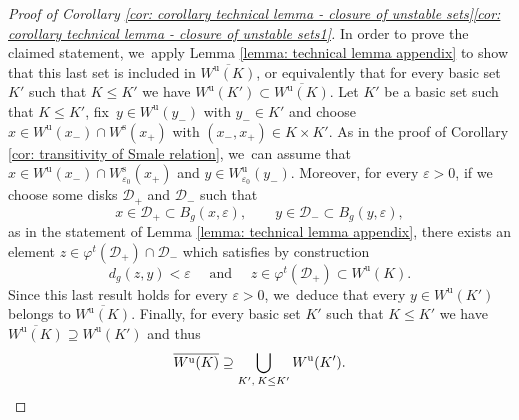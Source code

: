 \documentclass[11pt]{article}
\newcommand{\rs}{\mathrm{s}}
\newcommand{\ru}{\mathrm{u}}
\theoremstyle{definition}
\theoremstyle{plain}
\newcommand{\D}{\mathcal{D}}
\begin{document}
\begin{appendix}
\begin{proof}[Proof of Corollary \ref{cor: corollary technical lemma - closure of unstable sets}\eqref{cor: corollary technical lemma - closure of unstable sets1}]
In order to prove the claimed statement, we~apply Lemma \ref{lemma: technical lemma appendix} to show that this last set is included in $\overline{W^\ru (K)}$, or equivalently that for every basic set $K'$ such that $K \leq K'$ we have $W^\ru (K') \subset \overline{W^\ru (K)}$. Let $K'$ be a basic set such that $K \leq K'$, fix~$y \in W^\ru (y_-)$ with $y_- \in K'$ and choose $x \in W^\ru (x_-) \cap W^\rs (x_+)$ with $(x_-, x_+) \in K \times K'$. As in the proof of Corollary \ref{cor: transitivity of Smale relation}, we~can assume that $x \in W^\ru (x_-) \cap W_{\varepsilon_0}^\rs (x_+)$ and $y \in W_{\varepsilon_0}^\ru (y_-)$. Moreover, for every $\varepsilon > 0$, if we choose some disks $\D_+$ and $\D_-$ such that
\[
x \in \D_+ \subset B_g (x, \varepsilon), \qquad y \in \D_- \subset B_g (y, \varepsilon),
\]
as in the statement of Lemma \ref{lemma: technical lemma appendix}, there exists an element $z \in \varphi^t (\D_{+}) \cap \D_{-}$ which satisfies by construction
\[
d_g \left(z, y \right) < \varepsilon \quad\text{ and }\quad z \in \varphi^t (\D_{+}) \subset W^\ru (K).
\]
Since this last result holds for every $\varepsilon > 0$, we~deduce that every $y \in W^\ru (K')$ belongs to $\overline{W^\ru (K)}$. Finally, for every basic set $K'$ such that $K\leq K'$ we have $\overline{W^\ru (K)} \supseteq W^\ru (K')$ and thus
\[
\overline{W^\ru (K)} \supseteq \bigcup_{K', \: K \leq K'} W^\ru (K').\qedhere
\]
\end{proof}


\end{appendix}
\end{document}
